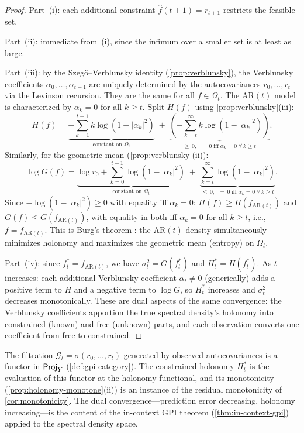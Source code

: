 \begin{proof}
Part~(i): each additional constraint $\widehat{f}(t+1) = r_{t+1}$ restricts the feasible set.

Part~(ii): immediate from~(i), since the infimum over a smaller set is at least as large.

Part~(iii): by the Szeg\H{o}--Verblunsky identity (\cref{prop:verblunsky}), the Verblunsky coefficients $\alpha_0, \ldots, \alpha_{t-1}$ are uniquely determined by the autocovariances $r_0, \ldots, r_t$ via the Levinson recursion. They are the same for all $f \in \Omega_t$. The AR$(t)$ model is characterized by $\alpha_k = 0$ for all $k \geq t$. Split $H(f)$ using \cref{prop:verblunsky}(iii):
\[
H(f) = \underbrace{-\sum_{k=1}^{t-1} k\log(1-|\alpha_k|^2)}_{\text{constant on }\Omega_t} \;+\; \underbrace{\left(-\sum_{k=t}^{\infty} k\log(1-|\alpha_k|^2)\right)}_{\geq\, 0,\;\; =\, 0 \;\text{iff}\; \alpha_k = 0\;\forall\, k \geq t}.
\]
Similarly, for the geometric mean (\cref{prop:verblunsky}(ii)):
\[
\log G(f) = \underbrace{\log r_0 + \sum_{k=0}^{t-1}\log(1-|\alpha_k|^2)}_{\text{constant on }\Omega_t} \;+\; \underbrace{\sum_{k=t}^{\infty}\log(1-|\alpha_k|^2)}_{\leq\, 0,\;\; =\, 0 \;\text{iff}\; \alpha_k = 0\;\forall\, k \geq t}.
\]
Since $-\log(1-|\alpha_k|^2) \geq 0$ with equality iff $\alpha_k = 0$: $H(f) \geq H(f_{\mathrm{AR}(t)})$ and $G(f) \leq G(f_{\mathrm{AR}(t)})$, with equality in both iff $\alpha_k = 0$ for all $k \geq t$, i.e., $f = f_{\mathrm{AR}(t)}$. This is Burg's theorem \cite{Burg}: the AR$(t)$ density simultaneously minimizes holonomy and maximizes the geometric mean (entropy) on $\Omega_t$.

Part~(iv): since $f_t^* = f_{\mathrm{AR}(t)}$, we have $\sigma_t^2 = G(f_t^*)$ and $H_t^* = H(f_t^*)$. As $t$ increases: each additional Verblunsky coefficient $\alpha_t \neq 0$ (generically) adds a positive term to $H$ and a negative term to $\log G$, so $H_t^*$ increases and $\sigma_t^2$ decreases monotonically. These are dual aspects of the same convergence: the Verblunsky coefficients apportion the true spectral density's holonomy into constrained (known) and free (unknown) parts, and each observation converts one coefficient from free to constrained.
\end{proof}

\begin{remark}
The filtration $\mathcal{G}_t = \sigma(r_0, \ldots, r_t)$ generated by observed autocovariances is a functor in $\mathsf{Proj}_Y$ (\cref{def:gpi-category}). The constrained holonomy $H_t^*$ is the evaluation of this functor at the holonomy functional, and its monotonicity (\cref{prop:holonomy-monotone}(ii)) is an instance of the residual monotonicity of \cref{cor:monotonicity}. The dual convergence---prediction error decreasing, holonomy increasing---is the content of the in-context GPI theorem (\cref{thm:in-context-gpi}) applied to the spectral density space.
\end{remark}

